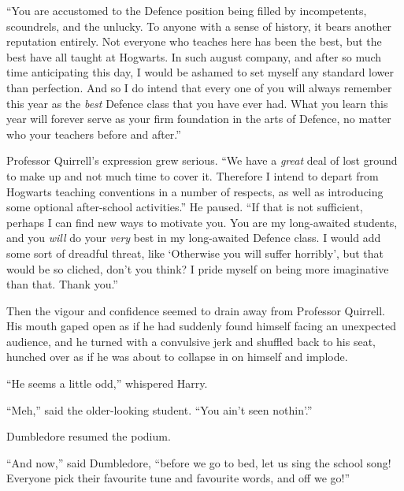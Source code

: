 “You are accustomed to the Defence position being filled by incompetents, scoundrels, and the unlucky. To anyone with a sense of history, it bears another reputation entirely. Not everyone who teaches here has been the best, but the best have all taught at Hogwarts. In such august company, and after so much time anticipating this day, I would be ashamed to set myself any standard lower than perfection. And so I do intend that every one of you will always remember this year as the \emph{best} Defence class that you have ever had. What you learn this year will forever serve as your firm foundation in the arts of Defence, no matter who your teachers before and after.”

Professor Quirrell’s expression grew serious. “We have a \emph{great} deal of lost ground to make up and not much time to cover it. Therefore I intend to depart from Hogwarts teaching conventions in a number of respects, as well as introducing some optional after-school activities.” He paused. “If that is not sufficient, perhaps I can find new ways to motivate you. You are my long-awaited students, and you \emph{will} do your \emph{very} best in my long-awaited Defence class. I would add some sort of dreadful threat, like ‘Otherwise you will suffer horribly’, but that would be so cliched, don’t you think? I pride myself on being more imaginative than that. Thank you.”

Then the vigour and confidence seemed to drain away from Professor Quirrell. His mouth gaped open as if he had suddenly found himself facing an unexpected audience, and he turned with a convulsive jerk and shuffled back to his seat, hunched over as if he was about to collapse in on himself and implode.

“He seems a little odd,” whispered Harry.

“Meh,” said the older-looking student. “You ain’t seen nothin’.”

Dumbledore resumed the podium.

“And now,” said Dumbledore, “before we go to bed, let us sing the school song! Everyone pick their favourite tune and favourite words, and off we go!”

